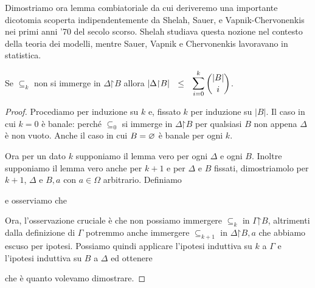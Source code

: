 Dimostriamo ora lemma combiatoriale da cui deriveremo una importante dicotomia scoperta indipendentemente da Shelah, Sauer, e Vapnik-Cher\-vo\-nen\-kis nei primi anni '70 del secolo scorso. Shelah studiava questa nozione nel contesto della teoria dei modelli, mentre Sauer, Vapnik e Chervonenkis lavoravano in statistica. 


\begin{lemma}
Se $\subseteq_k$ non si immerge in $\Delta\mathord\restriction B$ allora $\displaystyle \left|\Delta\mathord\restriction B \right|\ \ \le\ \ \mathop{\mbox{\large$\displaystyle\sum$}}^{k}_{i=0} \binom{|B|}{i}$.
\end{lemma}

\begin{proof}
Procediamo per induzione su $k$ e, fissato $k$ per induzione su $|B|$. Il caso in cui $k=0$ \`e banale: perch\'e $\subseteq_0$ si immerge in $\Delta\mathord\restriction B$ per qualsiasi $B$ non appena $\Delta$ \`e non vuoto. Anche il caso in cui $B=\varnothing$ \`e banale per ogni $k$. 

Ora per un dato $k$ supponiamo il lemma vero per ogni $\Delta$ e ogni $B$. Inoltre supponiamo il lemma vero anche per $k+1$ e per $\Delta$ e $B$ fissati, dimostriamolo per $k+1$, $\Delta$ e $B,a$ con $a\in\Omega$ arbitrario. Definiamo

\ceq{\hfill \Gamma}{=}{\Big\{\phi\in\Delta\ :\ \E\psi\in\Delta\ \big[ a\in\phi\sm\psi\ \wedge\ \phi\cap B=\psi\cap B\big] \Big\}}

e osserviamo che 


Ora, l'osservazione cruciale \`e che non possiamo immergere $\subseteq_k$ in $\Gamma\mathord\restriction B$, altrimenti dalla definizione di $\Gamma$ potremmo anche immergere $\subseteq_{k+1}$ in $\Delta\mathord\restriction B,a$ che abbiamo escuso per ipotesi. Possiamo quindi applicare l'ipotesi induttiva su $k$ a $\Gamma$ e l'ipotesi induttiva su $B$ a $\Delta$ ed ottenere





che \`e quanto volevamo dimostrare.
\end{proof}


